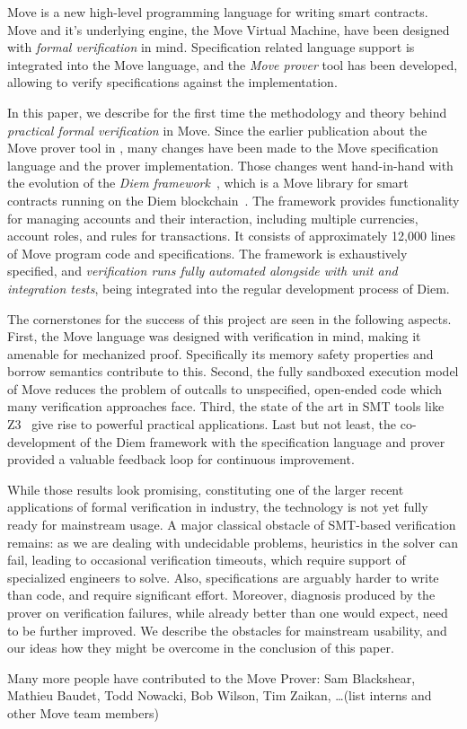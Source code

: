 
Move \cite{MOVE_LANG} is a new high-level programming language for writing smart
contracts.  Move and it's underlying engine, the Move Virtual Machine, have been
designed with \emph{formal verification} in mind. Specification related language
support is integrated into the Move language, and the \emph{Move prover} tool
has been developed, allowing to verify specifications against the implementation.

In this paper, we describe for the first time the methodology and theory behind
\emph{practical formal verification} in Move.  Since the earlier publication
about the Move prover tool in \cite{MOVE_PROVER}, many changes have been made to
the Move specification language and the prover implementation. Those changes
went hand-in-hand with the evolution of the \emph{Diem
  framework}~\cite{DIEM_FRAMEWORK}, which is a Move library for smart contracts
running on the Diem blockchain~\cite{DIEM}. The framework provides functionality
for managing accounts and their interaction, including multiple currencies,
account roles, and rules for transactions.  It consists of approximately 12,000
lines of Move program code and specifications.  The framework is exhaustively
specified, and \emph{verification runs fully automated alongside with unit and
  integration tests}, being integrated into the regular development process of
Diem.

The cornerstones for the success of this project are seen in the following
aspects.  First, the Move language was designed with verification in mind,
making it amenable for mechanized proof. Specifically its memory safety
properties and borrow semantics contribute to this. Second, the fully sandboxed
execution model of Move reduces the problem of outcalls to unspecified,
open-ended code which many verification approaches face. Third, the state of the
art in SMT tools like Z3~\cite{Z3} give rise to powerful practical
applications. Last but not least, the co-development of the Diem framework with
the specification language and prover provided a valuable feedback loop for
continuous improvement.

While those results look promising, constituting one of the larger recent
applications of formal verification in industry, the technology is not yet fully
ready for mainstream usage. A major classical obstacle of SMT-based verification
remains: as we are dealing with undecidable problems, heuristics in the solver
can fail, leading to occasional verification timeouts, which require support of
specialized engineers to solve. Also, specifications are arguably harder to
write than code, and require significant effort. Moreover, diagnosis produced by
the prover on verification failures, while already better than one would expect,
need to be further improved.  We describe the obstacles for mainstream
usability, and our ideas how they might be overcome in the conclusion of this
paper.

 Many more people have contributed to the Move Prover: Sam Blackshear, Mathieu Baudet, Todd Nowacki, Bob Wilson, Tim Zaikan, \ldots (list interns and other Move team members)



